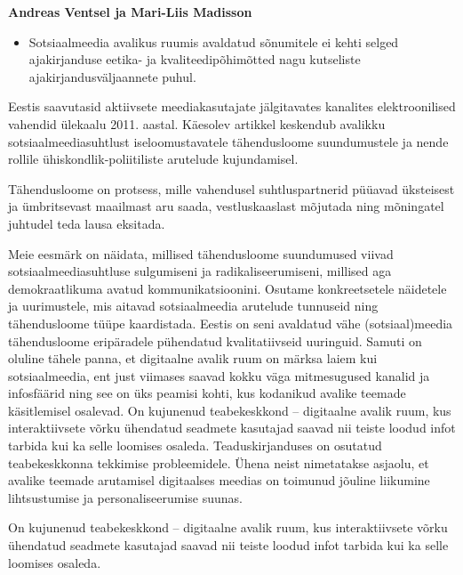 \documentclass[estonian,]{article}
\providecommand{\tightlist}{%
  \setlength{\itemsep}{0pt}\setlength{\parskip}{0pt}}
\begin{document}
\begin{authors}
\textbf{Andreas Ventsel ja Mari-Liis Madisson}
\end{authors}

\begin{points}
\begin{itemize}
\tightlist
\item
  Sotsiaalmeedia avalikus ruumis avaldatud sõnumitele ei kehti selged
  ajakirjanduse eetika- ja kvaliteedipõhimõtted nagu kutseliste
  ajakirjandusväljaannete puhul.
\end{itemize}
\end{points}

Eestis saavutasid aktiivsete meediakasutajate jälgitavates kanalites elektroonilised vahendid ülekaalu 2011. aastal. Käesolev artikkel keskendub avalikku sotsiaalmeediasuhtlust iseloomustavatele tähendusloome suundumustele ja nende rollile ühiskondlik-poliitiliste arutelude kujundamisel.

\begin{blockquote-right}
Tähendusloome on protsess, mille vahendusel suhtluspartnerid püüavad
üksteisest ja ümbritsevast maailmast aru saada, vestluskaaslast mõjutada
ning mõningatel juhtudel teda lausa eksitada.
\end{blockquote-right}

Meie eesmärk on näidata, millised tähendusloome suundumused viivad sotsiaalmeediasuhtluse sulgumiseni ja radikaliseerumiseni, millised aga demokraatlikuma avatud kommunikatsioonini. Osutame konkreetsetele näidetele ja uurimustele, mis aitavad sotsiaalmeedia arutelude tunnuseid ning tähendusloome tüüpe kaardistada. Eestis on seni avaldatud vähe (sotsiaal)meedia tähendusloome eripäradele pühendatud kvalitatiivseid uuringuid. Samuti on oluline tähele panna, et digitaalne avalik ruum on märksa laiem kui sotsiaalmeedia, ent just viimases saavad kokku väga mitmesugused kanalid ja infosfäärid ning see on üks peamisi kohti, kus kodanikud avalike teemade käsitlemisel osalevad. On kujunenud teabekeskkond -- digitaalne avalik ruum, kus interaktiivsete võrku ühendatud seadmete kasutajad saavad nii teiste loodud infot tarbida kui ka selle loomises osaleda. Teaduskirjanduses on osutatud teabekeskkonna tekkimise probleemidele. Ühena neist nimetatakse asjaolu, et avalike teemade arutamisel digitaalses meedias on toimunud jõuline liikumine lihtsustumise ja personaliseerumise suunas.

\begin{blockquote-left}
On kujunenud teabekeskkond -- digitaalne avalik ruum, kus
interaktiivsete võrku ühendatud seadmete kasutajad saavad nii teiste
loodud infot tarbida kui ka selle loomises osaleda.
\end{blockquote-left}
\end{document}

